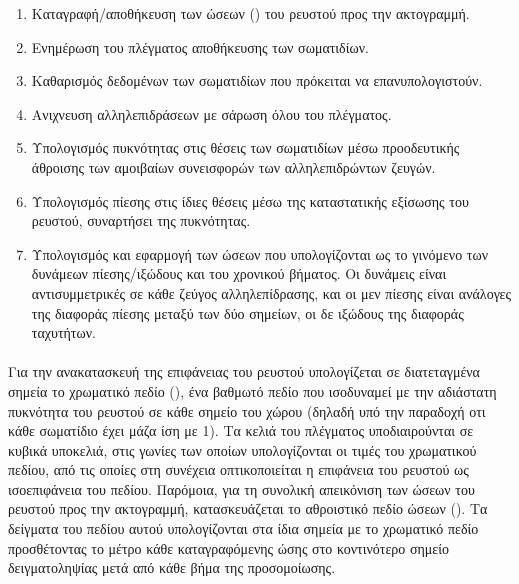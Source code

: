 \begin{enumerate}
\item Καταγραφή/αποθήκευση των ώσεων () του ρευστού προς την ακτογραμμή.

\item Ενημέρωση του πλέγματος αποθήκευσης των σωματιδίων.

\item Καθαρισμός δεδομένων των σωματιδίων που πρόκειται να επανυπολογιστούν.

\item Ανιχνευση αλληλεπιδράσεων με σάρωση όλου του πλέγματος.

\item Υπολογισμός πυκνότητας στις θέσεις των σωματιδίων μέσω προοδευτικής άθροισης των
  αμοιβαίων συνεισφορών των αλληλεπιδρώντων ζευγών.

\item Υπολογισμός πίεσης στις ίδιες θέσεις μέσω της καταστατικής εξίσωσης του ρευστού,
  συναρτήσει της πυκνότητας.

\item Υπολογισμός και εφαρμογή των ώσεων που υπολογίζονται ως το γινόμενο των δυνάμεων
  πίεσης/ιξώδους και του χρονικού βήματος. Οι δυνάμεις είναι αντισυμμετρικές σε κάθε
  ζεύγος αλληλεπίδρασης, και οι μεν πίεσης είναι ανάλογες της διαφοράς πίεσης μεταξύ των
  δύο σημείων, οι δε ιξώδους της διαφοράς ταχυτήτων.
\end{enumerate}

\paragraph{} Για την ανακατασκευή της επιφάνειας του ρευστού υπολογίζεται σε διατεταγμένα
σημεία το χρωματικό πεδίο (), ένα βαθμωτό πεδίο που ισοδυναμεί με την
αδιάστατη πυκνότητα του ρευστού σε κάθε σημείο του χώρου (δηλαδή υπό την παραδοχή οτι κάθε
σωματίδιο έχει μάζα ίση με 1). Τα κελιά του πλέγματος υποδιαιρούνται σε κυβικά υποκελιά,
στις γωνίες των οποίων υπολογίζονται οι τιμές του χρωματικού πεδίου, από τις οποίες στη
συνέχεια οπτικοποιείται η επιφάνεια του ρευστού ως ισοεπιφάνεια του πεδίου. Παρόμοια, για
τη συνολική απεικόνιση των ώσεων του ρευστού προς την ακτογραμμή, κατασκευάζεται το
αθροιστικό πεδίο ώσεων (). Τα δείγματα του πεδίου αυτού υπολογίζονται
στα ίδια σημεία με το χρωματικό πεδίο προσθέτοντας το μέτρο κάθε καταγραφόμενης ώσης στο
κοντινότερο σημείο δειγματοληψίας μετά από κάθε βήμα της προσομοίωσης.

